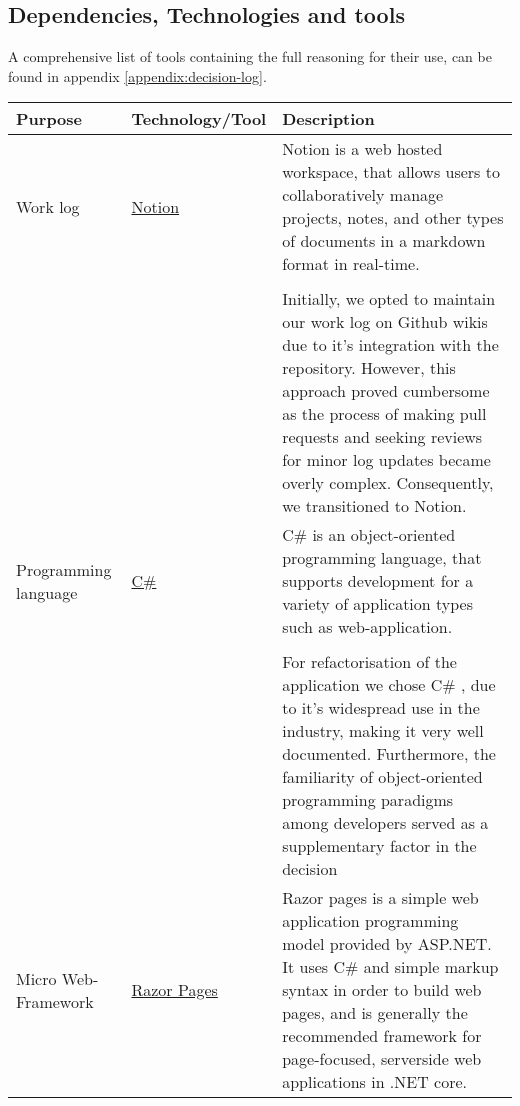 \subsection{Dependencies, Technologies and tools}


A comprehensive list of tools containing the full reasoning for their use, can be found in appendix \ref{appendix:decision-log}.\\

\begin{table}[H]
    \centering
    \begin{tabular}{|p{}|p{} | p{}|}
        \hline
        \textbf{Purpose} & \textbf{Technology/Tool} & \textbf{Description}\\
        \hline
         Work log & \href{https://www.notion.so/help/guides/category/documentation}{Notion} & Notion is a web hosted workspace, that allows users to collaboratively manage projects, notes, and other types of documents in a markdown format in real-time.\\
         &&\\
         && Initially, we opted to maintain our work log on Github wikis due to it's integration with the repository. However, this approach proved cumbersome as the process of making pull requests and seeking reviews for minor log updates became overly complex. Consequently, we transitioned to Notion.\\ 
         \hline
         Programming language & \href{https://learn.microsoft.com/en-us/dotnet/csharp/}{C\#} &
         C\#  is an object-oriented programming language, that supports development for a variety of application types such as web-application.\\
         && \\
         && For refactorisation of the application we chose C\# , due to it's widespread use in the industry, making it very well documented. Furthermore, the familiarity of object-oriented programming paradigms among developers served as a supplementary factor in the decision\\
         \hline
         Micro Web-Framework & \href{https://learn.microsoft.com/en-us/aspnet/core/razor-pages/?view=aspnetcore-8.0&tabs=visual-studio}{Razor Pages} & Razor pages is a simple web application programming model provided by ASP.NET. It uses C\# and simple markup syntax in order to build web pages, and is generally the recommended framework for page-focused, serverside web applications in .NET core.\\

\end{tabular}
\end{table}
